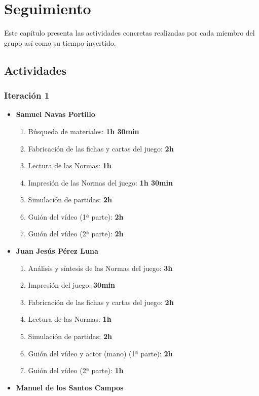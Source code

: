 \documentclass[11 pt]{book}
\begin{document}
\chapter{Seguimiento}
	Este capítulo presenta las actividades concretas realizadas por cada miembro del grupo así como su tiempo invertido.
	
	\section{Actividades}
	    \subsection*{Iteración 1}
		    \begin{itemize}
			    \item \textbf {Samuel Navas Portillo}
				    \begin{enumerate}
					    \item Búsqueda de materiales: \textbf{1h 30min}
					    \item Fabricación de las fichas y cartas del juego: \textbf{2h}
					    \item Lectura de las Normas: \textbf{1h}
					    \item Impresión de las Normas del juego: \textbf{1h 30min}
					    \item Simulación de partidas: \textbf{2h}
					    \item Guión del vídeo (1ª parte): \textbf{2h}
					    \item Guión del vídeo (2ª parte): \textbf{2h}
				    \end{enumerate}
			    \item \textbf {Juan Jesús Pérez Luna}
				    \begin{enumerate}
					    \item Análisis y síntesis de las Normas del juego: \textbf{3h}
					    \item Impresión del juego: \textbf{30min}
					    \item Fabricación de las fichas y cartas del juego: \textbf{2h}
					    \item Lectura de las Normas: \textbf{1h}
					    \item Simulación de partidas: \textbf{2h}
					    \item Guión del vídeo y actor (mano) (1ª parte): \textbf{2h}
					    \item Guión del vídeo (2ª parte): \textbf{1h}
				    \end{enumerate}
			    \item \textbf {Manuel de los Santos Campos}

\end{itemize}
\end{document}
